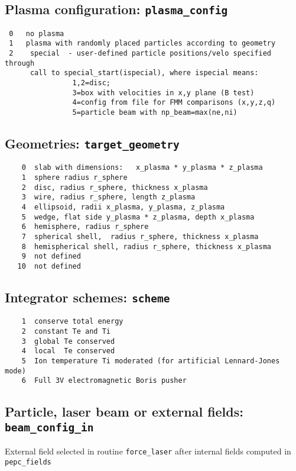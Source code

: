 \documentclass[12pt,psfig]{article}
\begin{document}
\subsection{Plasma configuration:  {\tt plasma\_config}}
\begin{verbatim}
 0   no plasma
 1   plasma with randomly placed particles according to geometry
 2    special  - user-defined particle positions/velo specified through 
      call to special_start(ispecial), where ispecial means:
                1,2=disc;
                3=box with velocities in x,y plane (B test)
                4=config from file for FMM comparisons (x,y,z,q)
                5=particle beam with np_beam=max(ne,ni)
\end{verbatim}

\subsection{Geometries:  {\tt target\_geometry}}
\begin{verbatim}
    0  slab with dimensions:   x_plasma * y_plasma * z_plasma
    1  sphere radius r_sphere
    2  disc, radius r_sphere, thickness x_plasma
    3  wire, radius r_sphere, length z_plasma
    4  ellipsoid, radii x_plasma, y_plasma, z_plasma
    5  wedge, flat side y_plasma * z_plasma, depth x_plasma
    6  hemisphere, radius r_sphere
    7  spherical shell,  radius r_sphere, thickness x_plasma
    8  hemispherical shell, radius r_sphere, thickness x_plasma
    9  not defined
   10  not defined 
\end{verbatim}

\subsection{Integrator schemes:  {\tt scheme}}
\begin{verbatim}
    1  conserve total energy
    2  constant Te and Ti 
    3  global Te conserved
    4  local  Te conserved
    5  Ion temperature Ti moderated (for artificial Lennard-Jones mode) 
    6  Full 3V electromagnetic Boris pusher  
\end{verbatim}

\subsection{Particle, laser beam or external fields:   {\tt beam\_config\_in}}
  External field selected in routine {\tt force\_laser}
  after internal fields computed in {\tt pepc\_fields}
\end{document}
